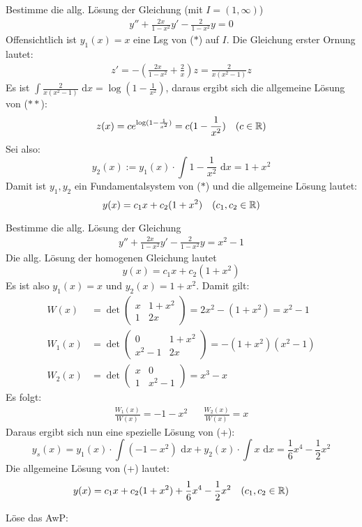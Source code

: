 \documentclass[a4paper,twoside,DIV15,BCOR12mm,chapterprefix=true,headings=twolinechapter]{scrbook}
\begin{document}
\begin{beispiele}
\item Bestimme die allg. Lösung der Gleichung (mit $I=(1,\infty)$)
\begin{align*}
\tag{$*$} y''+\frac{2x}{1-x^2}y'-\frac{2}{1-x^2}y=0
\end{align*}
Offensichtlich ist $y_1(x)=x$ eine Lsg von ($*$) auf $I$. Die Gleichung erster Ornung lautet:
\begin{align*}
\tag{$**$} z'=-\left(\frac{2x}{1-x^2}+\frac 2x\right)z=\frac 2{x(x^2-1)} z
\end{align*}
Es ist $\int\frac2{x(x^2-1)}\text{ d}x=\log(1-\frac1{x^2})$, daraus ergibt sich die allgemeine
Lösung von ($**$):
\[z(x)=ce^{\log(1-\frac1{x^2})}=c(1-\frac1{x^2})\quad (c\in\mathbb{R})\]
Sei also:
\[y_2(x):=y_1(x)\cdot\int 1-\frac1{x^2}\text{ d}x=1+x^2\]
Damit ist $y_1,y_2$ ein Fundamentalsystem von ($*$) und die allgemeine Lösung lautet:
\[y(x)=c_1x+c_2(1+x^2)\quad (c_1,c_2\in\mathbb{R})\]
\item Bestimme die allg. Lösung der Gleichung
\begin{align*}
\tag{+} y''+\frac{2x}{1-x^2}y'-\frac{2}{1-x^2}y=x^2-1
\end{align*}
Die allg. Lösung der homogenen Gleichung lautet
\[y(x)=c_1x+c_2(1+x^2)\]
Es ist also $y_1(x)=x$ und $y_2(x)=1+x^2$. Damit gilt:
\begin{align*}
W(x)&=\det\begin{pmatrix}
x&1+x^2\\
1&2x
\end{pmatrix}=2x^2-(1+x^2)=x^2-1\\
W_1(x)&=\det\begin{pmatrix}
0&1+x^2\\
x^2-1&2x
\end{pmatrix}=-(1+x^2)(x^2-1)\\
W_2(x)&=\det\begin{pmatrix}
x&0\\
1&x^2-1	
\end{pmatrix}=x^3-x
\end{align*}
Es folgt:
\begin{align*}
\frac{W_1(x)}{W(x)}=-1-x^2 &&\frac{W_2(x)}{W(x)}=x  
\end{align*}
Daraus ergibt sich nun eine spezielle Lösung von (+):
\[y_s(x)=y_1(x)\cdot\int(-1-x^2)\text{ d}x+y_2(x)\cdot\int x\text{ d}x=\frac16 x^4-\frac12 x^2\]
Die allgemeine Lösung von (+) lautet:
\[y(x)=c_1x+c_2(1+x^2)+\frac16 x^4-\frac12 x^2\quad (c_1,c_2\in\mathbb{R})\]
\item Löse das AwP:

\end{beispiele}
\end{document}
